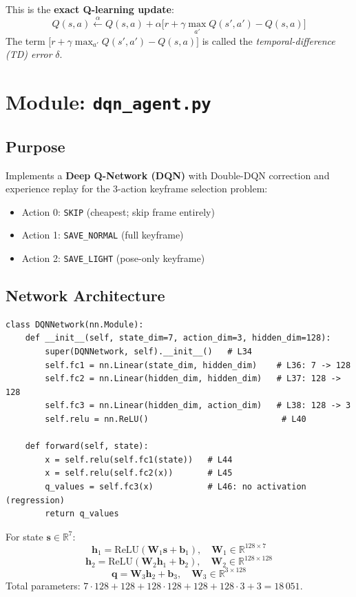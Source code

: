 \documentclass[12pt,a4paper,twoside]{report}
\theoremstyle{definition}
\newcommand{\vect}[1]{\bm{#1}}
\newcommand{\mat}[1]{\mathbf{#1}}
\newcommand{\R}{\mathbb{R}}
\newcommand{\code}[1]{\texttt{#1}}
\begin{document}
This is the \textbf{exact Q-learning update}:
\[
  Q(s,a) \xleftarrow{\alpha} Q(s,a) + \alpha\bigl[r + \gamma \max_{a'}Q(s',a') - Q(s,a)\bigr]
\]
The term $\bigl[r + \gamma \max_{a'}Q(s',a') - Q(s,a)\bigr]$ is called the
\emph{temporal-difference (TD) error} $\delta$.

\chapter{Module: \texttt{dqn\_agent.py}}

\section{Purpose}

Implements a \textbf{Deep Q-Network (DQN)} with Double-DQN correction and
experience replay for the 3-action keyframe selection problem:
\begin{itemize}
  \item Action 0: \code{SKIP} (cheapest; skip frame entirely)
  \item Action 1: \code{SAVE\_NORMAL} (full keyframe)
  \item Action 2: \code{SAVE\_LIGHT} (pose-only keyframe)
\end{itemize}

\section{Network Architecture}

\begin{lstlisting}
class DQNNetwork(nn.Module):
    def __init__(self, state_dim=7, action_dim=3, hidden_dim=128):
        super(DQNNetwork, self).__init__()   # L34
        self.fc1 = nn.Linear(state_dim, hidden_dim)    # L36: 7 -> 128
        self.fc2 = nn.Linear(hidden_dim, hidden_dim)   # L37: 128 -> 128
        self.fc3 = nn.Linear(hidden_dim, action_dim)   # L38: 128 -> 3
        self.relu = nn.ReLU()                           # L40

    def forward(self, state):
        x = self.relu(self.fc1(state))   # L44
        x = self.relu(self.fc2(x))       # L45
        q_values = self.fc3(x)           # L46: no activation (regression)
        return q_values
\end{lstlisting}

\begin{mathbox}
For state $\vect{s} \in \R^7$:
\[
  \vect{h}_1 = \mathrm{ReLU}(\mat{W}_1 \vect{s} + \vect{b}_1), \quad \mat{W}_1 \in \R^{128\times7}
\]
\[
  \vect{h}_2 = \mathrm{ReLU}(\mat{W}_2 \vect{h}_1 + \vect{b}_2), \quad \mat{W}_2 \in \R^{128\times128}
\]
\[
  \vect{q} = \mat{W}_3 \vect{h}_2 + \vect{b}_3, \quad \mat{W}_3 \in \R^{3\times128}
\]
Total parameters: $7\cdot128 + 128 + 128\cdot128 + 128 + 128\cdot3 + 3 = 18\,051$.
\end{mathbox}
\end{document}
